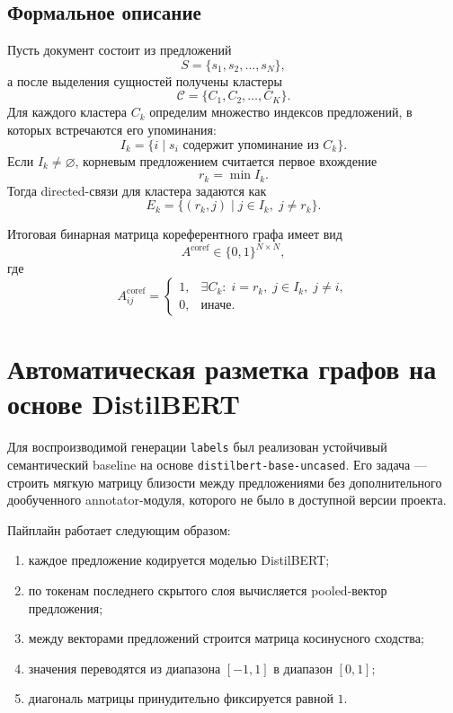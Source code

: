 \documentclass[12pt,a4paper]{article}
\begin{document}
\subsection{Формальное описание}

Пусть документ состоит из предложений
\[
S = \{s_1, s_2, \dots, s_N\},
\]
а после выделения сущностей получены кластеры
\[
\mathcal{C} = \{C_1, C_2, \dots, C_K\}.
\]
Для каждого кластера $C_k$ определим множество индексов предложений, в которых встречаются его упоминания:
\[
I_k = \{ i \mid s_i \text{ содержит упоминание из } C_k \}.
\]
Если $I_k \neq \varnothing$, корневым предложением считается первое вхождение
\[
r_k = \min I_k.
\]
Тогда directed-связи для кластера задаются как
\[
E_k = \{(r_k, j) \mid j \in I_k,\; j \neq r_k\}.
\]

Итоговая бинарная матрица кореферентного графа имеет вид
\[
A^{\text{coref}} \in \{0,1\}^{N \times N},
\]
где
\[
A^{\text{coref}}_{ij} =
\begin{cases}
1, & \exists C_k:\; i = r_k,\; j \in I_k,\; j \neq i,\\
0, & \text{иначе.}
\end{cases}
\]

\section{Автоматическая разметка графов на основе DistilBERT}

Для воспроизводимой генерации \texttt{labels} был реализован устойчивый семантический baseline на основе \texttt{distilbert-base-uncased}. Его задача --- строить мягкую матрицу близости между предложениями без дополнительного дообученного annotator-модуля, которого не было в доступной версии проекта.

Пайплайн работает следующим образом:

\begin{enumerate}
    \item каждое предложение кодируется моделью DistilBERT;
    \item по токенам последнего скрытого слоя вычисляется pooled-вектор предложения;
    \item между векторами предложений строится матрица косинусного сходства;
    \item значения переводятся из диапазона $[-1,1]$ в диапазон $[0,1]$;
    \item диагональ матрицы принудительно фиксируется равной $1$.
\end{enumerate}
\end{document}
